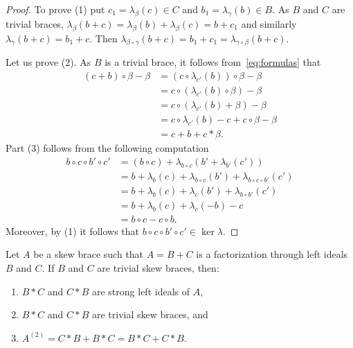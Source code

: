 \begin{proof}
	To prove (1) put $c_1=\lambda_\beta(c)\in C$ and $b_1=\lambda_{\gamma}(b)\in B$. As $B$ and $C$ are trivial braces, $\lambda_\beta(b+c) =\lambda_{\beta}(b)+\lambda_\beta(c)=b+c_1$ and similarly 
	$\lambda_\gamma(b+c)=b_1+c$.
	Then $\lambda_{\beta\circ\gamma}(b+c)=b_1+c_1=\lambda_{\gamma\circ\beta}(b+c)$. 
	
	Let us prove (2). As $B$ is a trivial brace, it follows from~\eqref{eq:formulas} that 
	\begin{align*}
		(c+b)\circ\beta-\beta &= (c\circ\lambda_{c'}(b))\circ\beta-\beta\\
		&=c\circ(\lambda_{c'}(b)\circ\beta)-\beta\\
		&=c\circ(\lambda_{c'}(b)+\beta)-\beta\\
		&=c\circ\lambda_{c'}(b)-c+c\circ\beta-\beta\\
		&=c+b+c*\beta.
	\end{align*}
	Part (3) follows from the following computation
	\begin{align*}
	    b \circ c \circ b' \circ c' &= (b\circ c) +\lambda_{b\circ c} (b' + \lambda_{b'}(c'))\\
	    &=b + \lambda_b(c) + \lambda_{b\circ c}(b') + \lambda_{b \circ c \circ b'}(c')\\
	     &= b+\lambda_{b}(c) + \lambda_{c}(b') + \lambda_{b\circ b'}(c')\\ 
	                                & =b + \lambda_b(c) +\lambda_c(-b) -c\\
	                                & =b \circ c - c \circ b.
	\end{align*}
	Moreover, by (1) it follows that $b \circ c \circ b' \circ c' \in \ker \lambda$.
\end{proof}

\begin{lemma}
\label{lem:hardworkfactoriz}
Let $A$ be a skew brace such that $A=B+C$ is a factorization through left ideals  $B$ and $C$. If $B$ and $C$ are trivial skew braces, then: 
\begin{enumerate}
    \item $B*C$ and $C*B$ are strong left ideals of $A$,
    \item $B*C$ and $C*B$ are trivial skew braces, and 
    \item $A^{(2)} = C*B+B*C=B*C+C*B$.
\end{enumerate}
\end{lemma}

